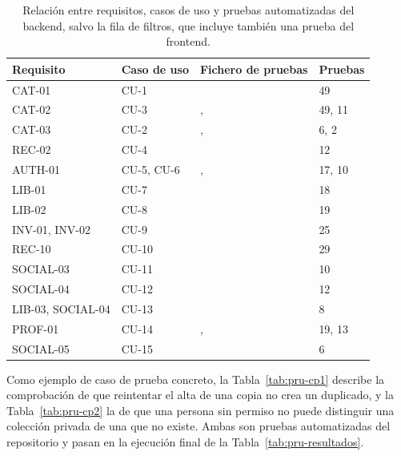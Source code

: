 \begin{table}[htp]
\centering
\small
\begin{tabularx}{\textwidth}{ | C{0.17\textwidth} | C{0.13\textwidth} | Y | C{0.12\textwidth} | }
    \hline
    \textbf{Requisito} & \textbf{Caso de uso} & \textbf{Fichero de pruebas} & \textbf{Pruebas} \\
    \hline
    CAT-01 & CU-1 &  & 49 \\
    \hline
    CAT-02 & CU-3 & ,  & 49, 11 \\
    \hline
    CAT-03 & CU-2 & ,  & 6, 2 \\
    \hline
    REC-02 & CU-4 &  & 12 \\
    \hline
    AUTH-01 & CU-5, CU-6 & ,  & 17, 10 \\
    \hline
    LIB-01 & CU-7 &  & 18 \\
    \hline
    LIB-02 & CU-8 &  & 19 \\
    \hline
    INV-01, INV-02 & CU-9 &  & 25 \\
    \hline
    REC-10 & CU-10 &  & 29 \\
    \hline
    SOCIAL-03 & CU-11 &  & 10 \\
    \hline
    SOCIAL-04 & CU-12 &  & 12 \\
    \hline
    LIB-03, SOCIAL-04 & CU-13 &  & 8 \\
    \hline
    PROF-01 & CU-14 & ,  & 19, 13 \\
    \hline
    SOCIAL-05 & CU-15 &  & 6 \\
    \hline
\end{tabularx}
\caption{Relación entre requisitos, casos de uso y pruebas automatizadas del backend, salvo la fila de filtros, que incluye también una prueba del frontend.}
\label{tab:pru-trazabilidad}
\end{table}

Como ejemplo de caso de prueba concreto, la Tabla~\ref{tab:pru-cp1} describe la comprobación de que reintentar el
alta de una copia no crea un duplicado, y la Tabla~\ref{tab:pru-cp2} la de que una persona sin permiso no puede
distinguir una colección privada de una que no existe. Ambas son pruebas automatizadas del repositorio y pasan en la
ejecución final de la Tabla~\ref{tab:pru-resultados}.

